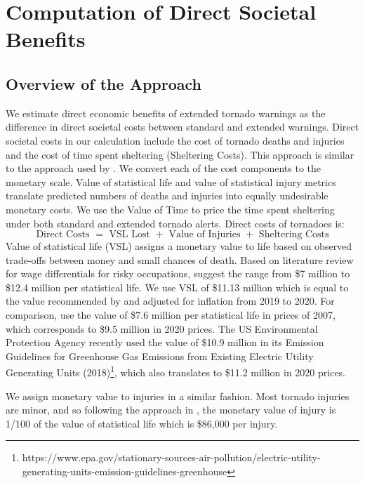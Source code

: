 \documentclass{ametsocV6.1}
\begin{document}
\vspace{20pt}
\section{Computation of Direct Societal Benefits}
\vspace{10pt}
\subsection{Overview of the Approach} 

We estimate direct economic benefits of extended tornado warnings as the difference in direct societal costs between standard and extended warnings. Direct societal costs in our calculation include the cost of tornado deaths and injuries and the cost of time spent sheltering (Sheltering Costs). This approach is similar to the approach used by \citet{simmons_economic_2013}. We convert each of the cost components to the monetary scale. Value of statistical life and value of statistical injury metrics translate predicted numbers of deaths and injuries into equally undesirable monetary costs. We use the Value of Time to price the time spent sheltering under both standard and extended tornado alerts. Direct costs of tornadoes is:
$$\mbox{Direct Costs }=\mbox{ VSL Lost }+\mbox{ Value of Injuries }+\mbox{ Sheltering Costs}$$
Value of statistical life (VSL) assigns a monetary value to life based on observed trade-offs between money and small chances of death. Based on literature review for wage differentials for risky occupations, \citet{viscusi_value_2003} suggest the range from \$7 million to \$12.4 million per statistical life. We use VSL of \$11.13 million which is equal to the value recommended by \citet{kniesner_value_2019} and adjusted for inflation from 2019 to 2020. For comparison, \citet{simmons_economic_2013} use the value of \$7.6 million per statistical life in prices of 2007, which corresponds to \$9.5 million in 2020 prices.  The US Environmental Protection Agency recently used the value of \$10.9 million in its Emission Guidelines for Greenhouse Gas Emissions from Existing Electric Utility Generating Units (2018)\footnote{https://www.epa.gov/stationary-sources-air-pollution/electric-utility-generating-units-emission-guidelines-greenhouse}, which also translates to \$11.2 million in 2020 prices.

We  assign monetary value to injuries in a similar fashion. Most tornado injuries are minor, and so following the approach in \citep*{simmons_direct_2006, simmons_economic_2013}, the monetary value of injury is 1/100 of the value of statistical life which is \$86,000 per injury.
\end{document}
